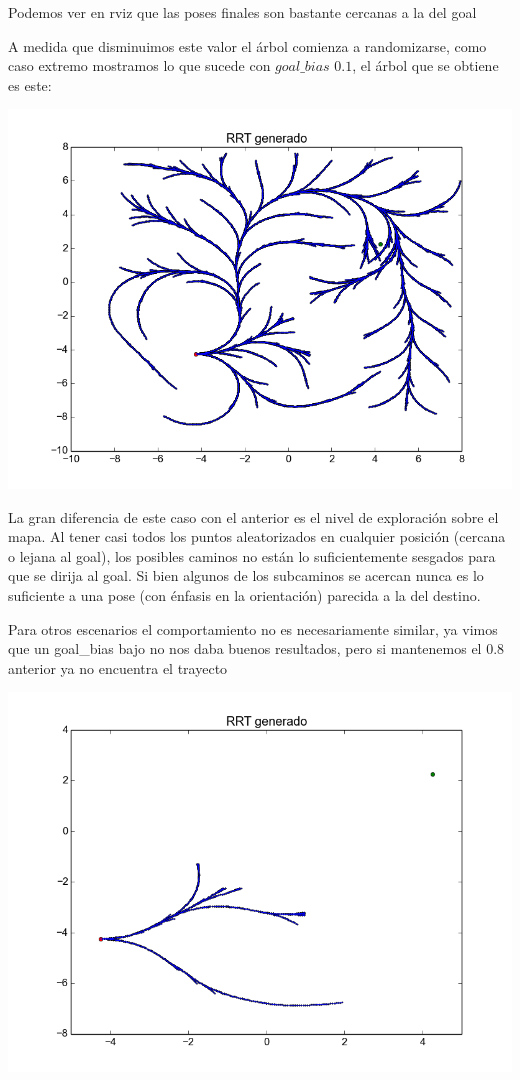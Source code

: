 Podemos ver en rviz que las poses finales son bastante cercanas a la del goal

A medida que disminuimos este valor el árbol comienza a randomizarse, como caso extremo mostramos lo que sucede con $goal\_bias$ $0.1$, el árbol que se obtiene es este:

\includegraphics[scale=0.5]{tp4_imagenes/informe_goal_bias_01.png}

La gran diferencia de este caso con el anterior es el nivel de exploración sobre el mapa. Al tener casi todos los puntos aleatorizados en cualquier posición (cercana o lejana al goal), los posibles caminos no están lo suficientemente sesgados para que se dirija al goal. Si bien algunos de los subcaminos se acercan nunca es lo suficiente a una pose (con énfasis en la orientación) parecida a la del destino.


Para otros escenarios el comportamiento no es necesariamente similar, ya vimos que un goal\_bias bajo no nos daba buenos resultados, pero si mantenemos el $0.8$ anterior ya no encuentra el trayecto

\includegraphics[scale=0.5]{tp4_imagenes/informe_goal_bias_dificil_08.png}

